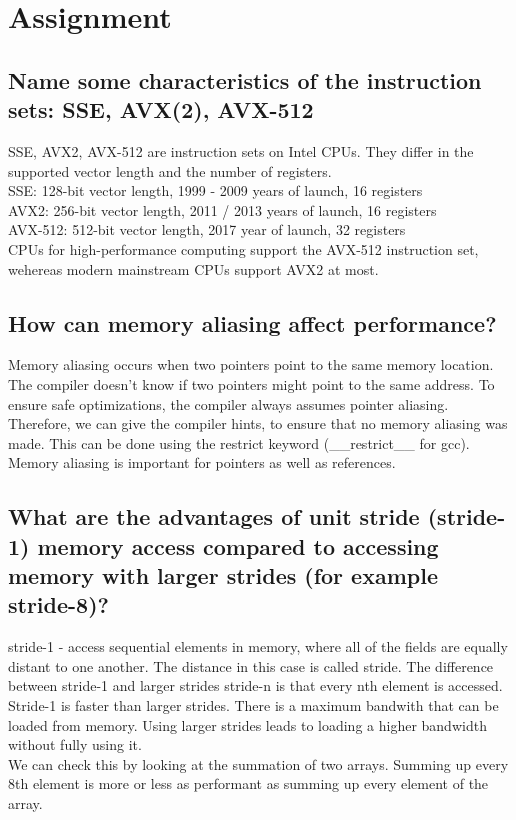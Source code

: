\documentclass[runningheads]{llncs}
\begin{document}
\section{Assignment}

\subsection{Name some characteristics of the instruction sets: SSE, AVX(2), AVX-512}
SSE, AVX2, AVX-512 are instruction sets on Intel CPUs. They differ in the supported vector length and the number of registers.
\\
SSE: 128-bit vector length, 1999 - 2009 years of launch, 16 registers
\\
AVX2: 256-bit vector length, 2011 / 2013 years of launch, 16 registers
\\
AVX-512: 512-bit vector length, 2017 year of launch, 32 registers
\\
CPUs for high-performance computing support the AVX-512 instruction set, wehereas modern mainstream CPUs support AVX2 at most.

\subsection{How can memory aliasing affect performance?}
Memory aliasing occurs when two pointers point to the same memory location.
The compiler doesn't know if two pointers might point to the same address. 
To ensure safe optimizations, the compiler always assumes pointer aliasing. 
Therefore, we can give the compiler hints, to ensure that no memory aliasing was made.
This can be done using the restrict keyword (\*\_\_restrict\_\_ for gcc). 
Memory aliasing is important for pointers as well as references.

\subsection{What are the advantages of unit stride (stride-1) memory access compared to accessing memory with larger strides (for example stride-8)?}
stride-1 - access sequential elements in memory, where all of the fields are equally distant to one another. The distance in this case is called stride.
The difference between stride-1 and larger strides stride-n is that every nth element is accessed.
\\
Stride-1 is faster than larger strides. There is a maximum bandwith that can be loaded from memory. 
Using larger strides leads to loading a higher bandwidth without fully using it.
\\
We can check this by looking at the summation of two arrays. 
Summing up every 8th element is more or less as performant as summing up every element of the array.
\end{document}
